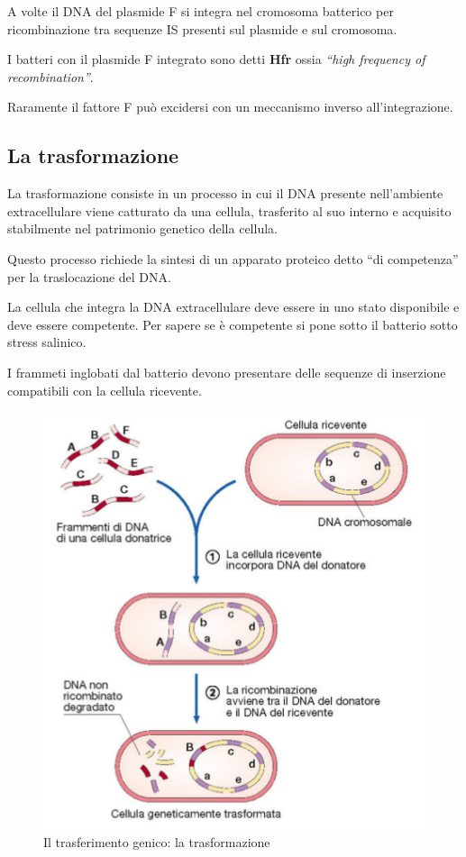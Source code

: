 \documentclass[11pt]{book}
\begin{document}
A volte il DNA del plasmide F si integra nel cromosoma batterico per ricombinazione tra sequenze IS presenti sul plasmide e sul cromosoma.

I batteri con il plasmide F integrato sono detti \textbf{Hfr} ossia \emph{``high frequency of recombination''}.

Raramente il fattore F può excidersi con un meccanismo inverso all’integrazione.

\subsection{La trasformazione}
La trasformazione consiste in un processo in cui il DNA presente nell’ambiente extracellulare viene catturato da una cellula, trasferito al suo interno e acquisito stabilmente nel patrimonio genetico della cellula. 

Questo processo richiede la sintesi di un apparato proteico detto ``di competenza'' per la traslocazione del DNA.

\vspace{1em}
La cellula che integra la DNA extracellulare deve essere in uno stato disponibile e deve essere competente. Per sapere se è competente si pone sotto il batterio sotto stress salinico. 

I frammeti inglobati dal batterio devono presentare delle sequenze di inserzione compatibili con la cellula ricevente.

\clearpage
\begin{figure}[htp]
\centering
\includegraphics[scale=0.5]{img/La trasformazione.png}
\caption{Il trasferimento genico: la trasformazione}
\label{}
\end{figure}
\end{document}
